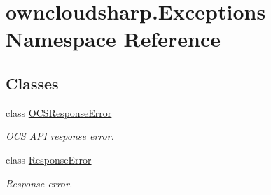 \hypertarget{namespaceowncloudsharp_1_1_exceptions}{}\section{owncloudsharp.\+Exceptions Namespace Reference}
\label{namespaceowncloudsharp_1_1_exceptions}
\subsection*{Classes}
\begin{DoxyCompactItemize}
\item 
class \hyperlink{classowncloudsharp_1_1_exceptions_1_1_o_c_s_response_error}{O\+C\+S\+Response\+Error}
\begin{DoxyCompactList}\small\item\em O\+CS A\+PI response error. \end{DoxyCompactList}\item 
class \hyperlink{classowncloudsharp_1_1_exceptions_1_1_response_error}{Response\+Error}
\begin{DoxyCompactList}\small\item\em Response error. \end{DoxyCompactList}\end{DoxyCompactItemize}
